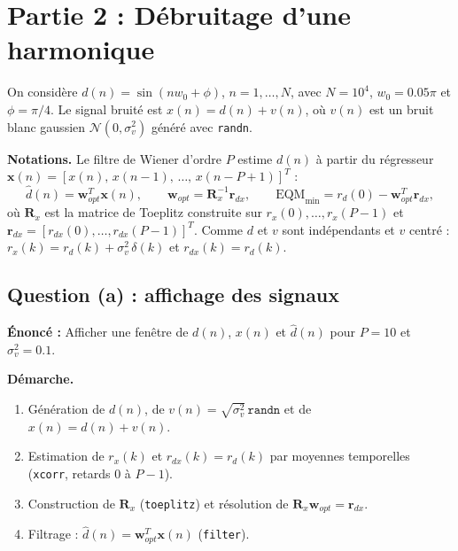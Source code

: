 \section{Partie 2 : Débruitage d'une harmonique}

On considère $d(n)=\sin(nw_0+\phi)$, $n=1,\dots,N$, avec $N=10^4$, $w_0=0.05\pi$ et $\phi=\pi/4$. Le signal bruité est $x(n)=d(n)+v(n)$, où $v(n)$ est un bruit blanc gaussien $\mathcal{N}(0,\sigma_v^2)$ généré avec \texttt{randn}.

\textbf{Notations.} Le filtre de Wiener d'ordre $P$ estime $d(n)$ à partir du régresseur $\mathbf{x}(n)=[x(n),\,x(n-1),\,\dots,\,x(n-P+1)]^T$ :
\[
\hat d(n)=\mathbf{w}_{opt}^T\mathbf{x}(n),\qquad
\mathbf{w}_{opt}=\mathbf{R}_x^{-1}\mathbf{r}_{dx},\qquad
\mathrm{EQM}_{\min}=r_d(0)-\mathbf{w}_{opt}^T\mathbf{r}_{dx},
\]
où $\mathbf{R}_x$ est la matrice de Toeplitz construite sur $r_x(0),\dots,r_x(P-1)$ et $\mathbf{r}_{dx}=[r_{dx}(0),\dots,r_{dx}(P-1)]^T$. Comme $d$ et $v$ sont indépendants et $v$ centré : $r_x(k)=r_d(k)+\sigma_v^2\,\delta(k)$ et $r_{dx}(k)=r_d(k)$.

\subsection{Question (a) : affichage des signaux}

\begin{enonce}
\textbf{Énoncé :} Afficher une fenêtre de $d(n)$, $x(n)$ et $\hat d(n)$ pour $P=10$ et $\sigma_v^2=0.1$.
\end{enonce}

\textbf{Démarche.}
\begin{enumerate}
  \item Génération de $d(n)$, de $v(n)=\sqrt{\sigma_v^2}\,\texttt{randn}$ et de $x(n)=d(n)+v(n)$.
  \item Estimation de $r_x(k)$ et $r_{dx}(k)=r_d(k)$ par moyennes temporelles (\texttt{xcorr}, retards $0$ à $P-1$).
  \item Construction de $\mathbf{R}_x$ (\texttt{toeplitz}) et résolution de $\mathbf{R}_x\mathbf{w}_{opt}=\mathbf{r}_{dx}$.
  \item Filtrage : $\hat d(n)=\mathbf{w}_{opt}^T\mathbf{x}(n)$ (\texttt{filter}).
\end{enumerate}

